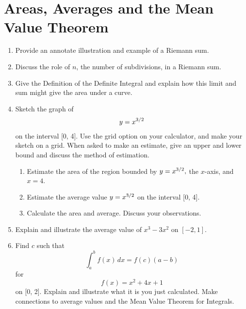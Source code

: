 \begin{enumerate}
\end{enumerate}\section{Areas, Averages and the Mean Value Theorem}\begin{enumerate}



\item Provide an annotate illustration and example of a Riemann sum.

\item Discuss the role of $n$, the number of subdivisions, in a Riemann sum.

\item Give the Definition of the Definite Integral and explain how this limit and sum might give the area under a curve.




\item   Sketch the graph of $$y = x^{{3 \mathord{\left/ {\vphantom {3 2}} \right. \kern-\nulldelimiterspace} 2}} $$ on the interval [0, 4].  Use the grid option on your calculator, and make your sketch on a grid.  When asked to make an estimate, give an upper and lower bound and discuss the method of estimation.

\begin{enumerate}


\item   Estimate the area of the region bounded by $y = x^{{3 \mathord{\left/ {\vphantom {3 2}} \right. \kern-\nulldelimiterspace} 2}} ,$ the $x$-axis, and $x = 4$.


\item   Estimate the average value $y = x^{{3 \mathord{\left/ {\vphantom {3 2}} \right. \kern-\nulldelimiterspace} 2}} $ on the interval [0, 4].

\item Calculate the area and average.  Discuss your observations.  \cite{SMo}

\end{enumerate}

\item   Explain and illustrate the average value of $x^3 - 3x^2$ on $[-2, 1]$.

\item   Find $c$ such that $$\int_a^b {f(x)\,dx}  = f(c)\left( {a - b} \right)$$ for $$f(x) = x^2  + 4x + 1$$ on [0, 2].  Explain and illustrate what it is you just calculated.  Make connections to average values and the Mean Value Theorem for Integrals.


\end{enumerate}
